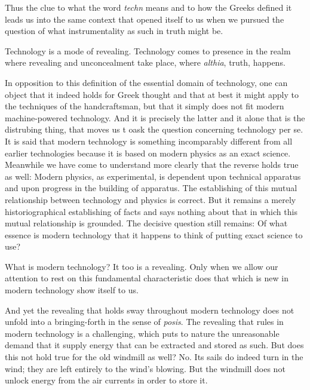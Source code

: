 Thus the clue to what the word \textit{techn} means and to how the Greeks defined it leads us into the same context that opened itself to us when we pursued the question of what instrumentality as such in truth might be.

Technology is a mode of revealing. Technology comes to presence in the realm where revealing and unconcealment take place, where \textit{althia}, truth, happens.

In opposition to this definition of the essential domain of technology, one can object that it indeed holds for Greek thought and that at best it might apply to the techniques of the handcraftsman, but that it simply does not fit modern machine-powered technology. And it is precisely the latter and it alone that is the distrubing thing, that moves us t oask the question concerning technology per se. It is said that modern technology is something incomparably different from all earlier technologies because it is based on modern physics as an exact science. Meanwhile we have come to understand more clearly that the reverse holds true as well: Modern physics, as experimental, is dependent upon technical apparatus and upon progress in the building of apparatus. The establishing of this mutual relationship between technology and physics is correct. But it remains a merely historiographical establishing of facts and says nothing about that in which this mutual relationship is grounded. The decisive question still remains: Of what essence is modern technology that it happens to think of putting exact science to use?

What is modern technology? It too is a revealing. Only when we allow our attention to rest on this fundamental characteristic does that which is new in modern technology show itself to us. 

And yet the revealing that holds sway throughout modern technology does not unfold into a bringing-forth in the sense of \textit{posis}. The revealing that rules in modern technology is a challenging, which puts to nature the unreasonable demand that it supply energy that can be extracted and stored as such. But does this not hold true for the old windmill as well? No. Its sails do indeed turn in the wind; they are left entirely to the wind's blowing. But the windmill does not unlock energy from the air currents in order to store it.

